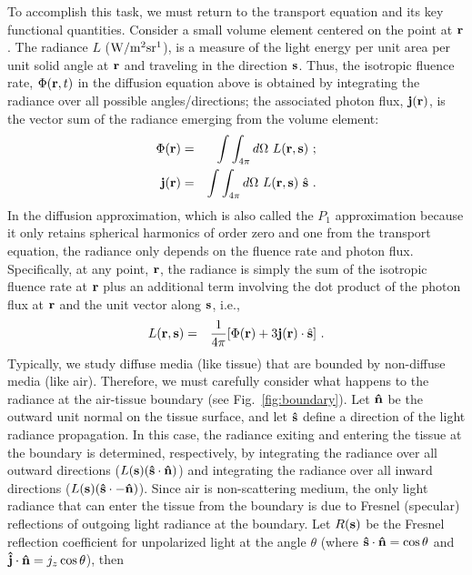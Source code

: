 To accomplish this task, we must return to the transport equation and its key functional quantities. Consider a small volume element centered on the point at $\mathbf{r}$. The radiance $L$ ($\rm{W/m^2sr^1}$), is a measure of the light energy per unit area per unit solid angle at $\mathbf{r}$ and traveling in the direction $\mathbf{s}$. Thus, the isotropic fluence rate, $\Phi(\mathbf{r},t)$ in the diffusion equation above is obtained by integrating the radiance over all possible angles/directions; the associated photon flux, $\mathbf{j(r)}$, is the vector sum of the radiance emerging from the volume element:
%
\begin{eqnarray}
\Phi(\mbf{r}) &=& \int\int_{4\pi} d\Omega \ L(\mbf{r},\mbf{ s})\ ; \\
\mbf{ j}(\mbf{ r}) &=& \int\int_{4\pi} d\Omega \ L(\mbf{ r},\mbf{ s}) \ \hat{\mbf{ s}} \ .
\end{eqnarray}
\indent
In the diffusion approximation, which is also called the $P_1$ approximation because it only retains spherical harmonics of order zero and one from the transport equation, the radiance only depends on the fluence rate and photon flux. Specifically, at any point, $\mathbf{ r}$, the radiance is simply the sum of the isotropic fluence rate at $\mathbf{ r}$ plus an additional term involving the dot product of the photon flux at $\mathbf{ r}$ and the unit vector along $\mathbf{s}$, i.e., 
%
\begin{eqnarray}
L(\mathbf{r},\mathbf{s}) &=& \frac{1}{4\pi} [ \Phi(\mathbf{r}) + 3 \mathbf{j}(\mathbf{r}) \cdot \hat{\mathbf{s}}] \ .
\end{eqnarray}
\ident
Typically, we study diffuse media (like tissue) that are bounded by non-diffuse media (like air). Therefore, we must carefully consider what happens to the radiance at the air-tissue boundary (see Fig.~\ref{fig:boundary}). Let $\mathbf{\hat{n}}$ be the outward unit normal on the tissue surface, and let $\mathbf{\hat{s}}$ define a direction of the light radiance propagation. In this case, the radiance exiting and entering the tissue at the boundary is determined, respectively, by integrating the radiance over all outward directions ($L(\mathbf{s}) (\mathbf{\hat{s}} \cdot \mathbf{\hat{n}})$) and integrating  the radiance over all inward directions ($L(\mathbf{s}) (\mathbf{\hat{s}} \cdot - \mathbf{\hat{n}})$). Since air is non-scattering medium, the only light radiance that can enter the tissue from the boundary is due to Fresnel (specular) reflections of outgoing light radiance at the boundary. Let $R(\mathbf{s})$ be the Fresnel reflection coefficient for unpolarized light at the angle $\theta$ (where $\mathbf{\hat{s}}\cdot \mathbf{\hat{n}}=\cos\theta$ and $\mathbf{\hat{j}}\cdot \mathbf{\hat{n}}=j_z\cos\theta$), then
